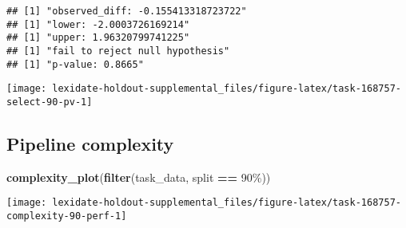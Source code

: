 \documentclass[
]{book}
\newenvironment{Shaded}{\begin{snugshade}}{\end{snugshade}}
\newcommand{\AttributeTok}[1]{\textcolor[rgb]{0.13,0.29,0.53}{#1}}
\newcommand{\DecValTok}[1]{\textcolor[rgb]{0.00,0.00,0.81}{#1}}
\newcommand{\FunctionTok}[1]{\textcolor[rgb]{0.13,0.29,0.53}{\textbf{#1}}}
\newcommand{\NormalTok}[1]{#1}
\newcommand{\OtherTok}[1]{\textcolor[rgb]{0.56,0.35,0.01}{#1}}
\newcommand{\SpecialCharTok}[1]{\textcolor[rgb]{0.81,0.36,0.00}{\textbf{#1}}}
\newcommand{\StringTok}[1]{\textcolor[rgb]{0.31,0.60,0.02}{#1}}
\begin{document}
\begin{Shaded}
\end{Shaded}

\begin{verbatim}
## [1] "observed_diff: -0.155413318723722"
## [1] "lower: -2.0003726169214"
## [1] "upper: 1.96320799741225"
## [1] "fail to reject null hypothesis"
## [1] "p-value: 0.8665"
\end{verbatim}

\texttt{[image: lexidate-holdout-supplemental\_files/figure-latex/task-168757-select-90-pv-1]}

\hypertarget{pipeline-complexity-22}{%
\subsection{Pipeline complexity}\label{pipeline-complexity-22}}

\begin{Shaded}
\begin{Highlighting}[]
\FunctionTok{complexity\_plot}\NormalTok{(}\FunctionTok{filter}\NormalTok{(task\_data, split }\SpecialCharTok{==} \StringTok{\textquotesingle{}90\%\textquotesingle{}}\NormalTok{))}
\end{Highlighting}
\end{Shaded}

\texttt{[image: lexidate-holdout-supplemental\_files/figure-latex/task-168757-complexity-90-perf-1]}
\end{document}
